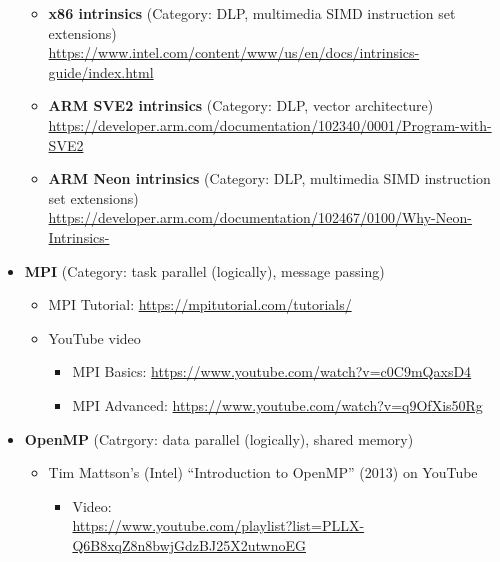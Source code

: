 \documentclass{article}
\begin{document}
\begin{itemize}
    \begin{itemize}
        \item \textbf{x86 intrinsics} (Category: DLP, multimedia SIMD instruction set extensions)\\
        \href{https://www.intel.com/content/www/us/en/docs/intrinsics-guide/index.html}{https://www.intel.com/content/www/us/en/docs/intrinsics-guide/index.html}
        \item \textbf{ARM SVE2 intrinsics} (Category: DLP, vector architecture)\\
        \href{https://developer.arm.com/documentation/102340/0001/Program-with-SVE2}{https://developer.arm.com/documentation/102340/0001/Program-with-SVE2}
        \item \textbf{ARM Neon intrinsics} (Category: DLP, multimedia SIMD instruction set extensions)\\
        \href{https://developer.arm.com/documentation/102467/0100/Why-Neon-Intrinsics-}{https://developer.arm.com/documentation/102467/0100/Why-Neon-Intrinsics-}
    \end{itemize}
    \item \textbf{MPI} (Category: task parallel (logically), message passing)
    \begin{itemize}
        \item MPI Tutorial:
        \href{https://mpitutorial.com/tutorials/}{https://mpitutorial.com/tutorials/}
        \item YouTube video
        \begin{itemize}
            \item MPI Basics:
            \href{https://www.youtube.com/watch?v=c0C9mQaxsD4}{https://www.youtube.com/watch?v=c0C9mQaxsD4}
            \item MPI Advanced:
            \href{https://www.youtube.com/watch?v=q9OfXis50Rg}{https://www.youtube.com/watch?v=q9OfXis50Rg}
        \end{itemize}
    \end{itemize}
    \item \textbf{OpenMP} (Catrgory: data parallel (logically), shared memory)
    \begin{itemize}
        \item Tim Mattson’s (Intel) “Introduction to OpenMP” (2013) on YouTube
        \begin{itemize}
            \item Video:\\
            \href{https://www.youtube.com/playlist?list=PLLX-Q6B8xqZ8n8bwjGdzBJ25X2utwnoEG}{https://www.youtube.com/playlist?list=PLLX-Q6B8xqZ8n8bwjGdzBJ25X2utwnoEG}

\end{itemize}
\end{itemize}
\end{itemize}
\end{document}
